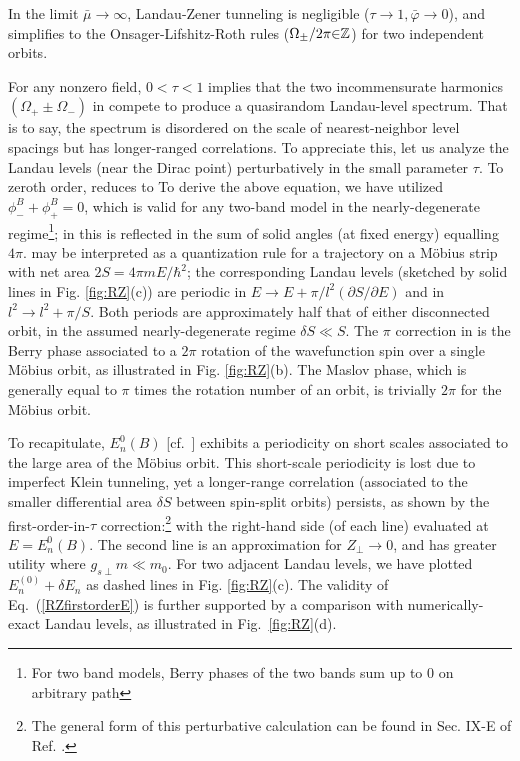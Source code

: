 \documentclass[aps, showpacs, twocolumn, notitlepage, superscriptaddress]{revtex4-1}
\begin{document}
In the limit $\bar{\mu}{\rightarrow} \infty$, Landau-Zener tunneling is negligible ($\tau{\rightarrow}1,\bar{\varphi}{\rightarrow}0$), and  simplifies to the Onsager-Lifshitz-Roth rules ($\Omega_{\pm}/2\pi{\in}\mathbb{Z}$) for two independent orbits.

For any nonzero field, $0{<}\tau{<}1$ implies that the two incommensurate harmonics $(\Omega_+{\pm}\Omega_-)$ in  compete to produce a quasirandom Landau-level spectrum\cite{kaganov_coherent_1983}. That is to say, the spectrum is disordered on the scale of nearest-neighbor level spacings but has longer-ranged correlations. To appreciate this, let us analyze the Landau levels (near the Dirac point) perturbatively in the small parameter $\tau$. To zeroth order,  reduces to
To derive the above equation, we have utilized $\phi^B_-{+}\phi^B_+{=}0$, which is valid for any two-band model in the nearly-degenerate regime\footnote{For two band models, Berry phases of the two bands sum up to 0 on arbitrary path}; in  this is reflected in the sum of solid angles (at fixed energy) equalling $4\pi$.  may be interpreted as a quantization rule for a trajectory on a M\"obius strip  with net area $2S{=}4\pi m E{/\hbar^2}$; the corresponding Landau levels (sketched by solid lines in Fig. \ref{fig:RZ}(c)) are periodic in $E{\rightarrow}E{+}\pi/l^2(\partial S/\partial E)$ and in $l^2{\rightarrow}l^2{+}\pi/S$. Both periods are approximately half that of either disconnected orbit, in the assumed nearly-degenerate regime $\delta S{\ll}S$. The $\pi$ correction in  is the Berry phase associated to a $2\pi$ rotation of the wavefunction spin over a single M\"obius orbit, as illustrated in Fig. \ref{fig:RZ}(b). The Maslov phase, which is generally equal to $\pi$ times the rotation number of an orbit, is trivially $2\pi$ for the M\"obius orbit.

To recapitulate, $E_n^0(B)$ [cf.\ ] exhibits a periodicity on short scales associated to the large area of the M\"obius orbit. This short-scale periodicity is lost due to  imperfect Klein tunneling, yet a longer-range correlation (associated to the smaller differential area $\delta S$ between spin-split orbits) persists, as shown by the first-order-in-$\tau$ correction:\footnote{The general form of this perturbative calculation can be found in Sec. IX-E of Ref. .} 
with the right-hand side (of each line) evaluated at $E{=}E_n^0(B)$. The second line is an approximation for $Z_{\perp}{\rightarrow}0$, and has greater utility where $g_{s\perp}m{\ll}m_0$. For two adjacent Landau levels, we have plotted $E_n^{(0)}+\delta E_n$ as dashed lines in Fig. \ref{fig:RZ}(c). The validity of Eq.\ (\ref{RZfirstorderE}) is further supported by a comparison with numerically-exact Landau levels, as illustrated in Fig.\ \ref{fig:RZ}(d).
\end{document}
